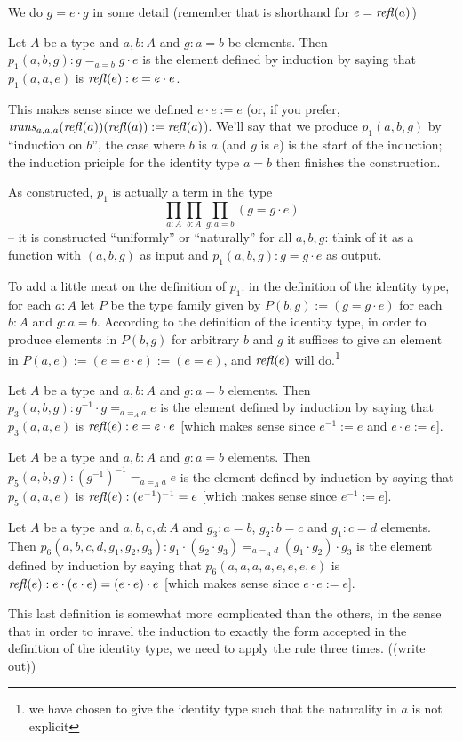 We do $g=e\cdot g$ in some detail (remember that is shorthand for $e=\mathop{{\it refl}}(a)$)
\begin{definition}
  Let $A$ be a type and $a, b:A$ and $g:a=b$ be elements.  Then $p_1(a,b,g):g=_{a=b}g\cdot e$ is the element defined by induction by saying that $p_1(a,a,e)$ is $\mathop{{\it refl}}(e):e=e\cdot e$.
\end{definition}
\begin{remark}
  This makes sense since we defined $e\cdot e:=e$ (or, if you prefer, $\mathop{{\it trans}}_{a,a,a}(\mathop{{\it refl}}(a))(\mathop{{\it refl}}(a)):=\mathop{{\it refl}}(a)$).  We'll say that we produce $p_1(a,b,g)$ by ``induction on $b$'', the case where $b$ is $a$ (and $g$ is $e$) is the start of the induction; the induction priciple for the identity type $a=b$ then finishes the construction.

As constructed, $p_1$ is actually a term in the type 
$$\prod_{a:A}\prod_{b:A}\prod_{g:a=b}(g=g\cdot e)$$ -- it is constructed ``uniformly'' or ``naturally'' for all $a,b,g$: think of it as a function with $(a,b,g)$ as input and $p_1(a,b,g):g=g\cdot e$ as output.  

To add a little meat on the definition of $p_1$: in the definition of the identity type, for each $a:A$ let $P$ be the type family given by $P(b,g):=(g=g\cdot e)$ for each $b:A$ and $g:a=b$.  According to the definition of the identity type, in order to produce elements in $P(b,g)$ for arbitrary $b$ and $g$ it suffices to give an element in $P(a,e):=(e=e\cdot e):=(e=e)$, and $\mathop{{\it refl}}(e)$ will do.\footnote{we have chosen to give the identity type such that the naturality in $a$ is not explicit}
\end{remark}
\begin{definition}
  Let $A$ be a type and $a,b:A$ and $g:a=b$ elements.  Then $p_3(a,b,g):g^{-1}\cdot g=_{a=_Aa} e$ is the element defined by induction by saying that $p_3(a,a,e)$ is $\mathop{{\it refl}}(e):e=e\cdot e$ [which makes sense since $e^{-1}:=e$ and $e\cdot e:=e$].
\end{definition}
\begin{definition}
  Let $A$ be a type and $a,b:A$ and $g:a=b$ elements.  Then $p_5(a,b,g):(g^{-1})^{-1}=_{a=_Aa} e$ is the element defined by induction by saying that $p_5(a,a,e)$ is $\mathop{{\it refl}}(e):(e^{-1})^{-1}=e$ [which makes sense since $e^{-1}:=e$].
\end{definition}
\begin{definition}
  Let $A$ be a type and $a,b,c,d:A$ and $g_3:a=b$, $g_2:b=c$ and $g_1:c=d$ elements.  Then $p_6(a,b,c,d,g_1,g_2,g_3):g_1\cdot(g_2\cdot g_3)=_{a=_Ad}(g_1\cdot g_2)\cdot g_3$ is the element defined by induction by saying that $p_6(a,a,a,a,e,e,e,e)$ is $\mathop{{\it refl}}(e):e\cdot(e\cdot e)=(e\cdot e)\cdot e$ [which makes sense since $e\cdot e:=e$].
\end{definition}
\begin{remark}
  This last definition is somewhat more complicated than the others, in the sense that in order to inravel the induction to exactly the form accepted in the definition of the identity type, we need to apply the rule three times.  ((write out))
\end{remark}

